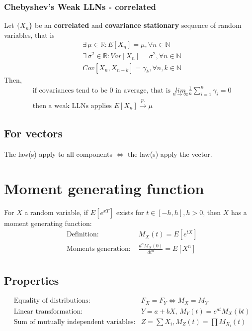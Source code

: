 \documentclass[../main.tex]{subfiles}
\begin{document}
\subsubsection{Chebyshev's Weak LLNs - correlated}
Let $\{X_n\}$ be an \textbf{correlated} and \textbf{covariance stationary} sequence of random variables, that is
\begin{align*}
    &\exists\, \mu \in \mathbb{R}: E[X_n] = \mu, \forall n \in \mathbb{N} \\
    &\exists\, \sigma^2 \in \mathbb{R}: Var[X_n] = \sigma^2, \forall n \in \mathbb{N} \\
    & Cov[X_n, X_{n+k}] = \gamma_k, \forall n,k \in \mathbb{N}
\end{align*}
Then, \\
\begin{align*}
    &\text{if covariances tend to be 0 in average, that is }\underset{n \to \infty}{lim} \frac{1}{n} \sum_{i=1}^{n} \gamma_i = 0 \\
    &\text{then a weak LLNs applies } E[X_n] \xrightarrow{p.} \mu
\end{align*}

\subsection{For vectors}
The law(s) apply to all components $\Longleftrightarrow$ the law(s) apply the vector.

\section{Moment generating function}
For $X$ a random variable, if $E[e^{xT}]$ exists for $t \in [-h, h], h > 0$,
then $X$ has a moment generating function:
\begin{align*}
    &\text{Definition: }&M_X(t) = E[e^{tX}] \\
    &\text{Moments generation: }&\frac{d^nM_X(0)}{dt^n} = E[X^n] \\
\end{align*}
\subsection{Properties}
\begin{align*}
    &\text{Equality of distributions: }& F_X = F_Y \Longleftrightarrow M_X = M_Y \\
    &\text{Linear transformation: }& Y = a + bX, \, M_Y(t) = e^{at}M_X(bt) \\
    &\text{Sum of mutually independent variables:}& Z =\sum{X_i}, M_Z(t) = \prod{M_{X_i}(t)}
\end{align*}
\end{document}
